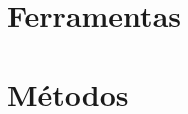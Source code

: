\chapter{Ferramentas}

\thispagestyle{plain}
 \label{ch:ferramentas}

\chapter{Métodos}
\thispagestyle{plain}
 \label{ch:metodos}

\thispagestyle{plain}
 \label{ch:metricas}